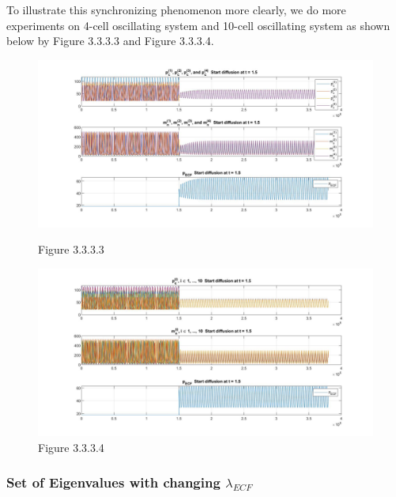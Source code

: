 \documentclass[12pt]{article}
\renewcommand{\(}{\left (}
\renewcommand{\)}{\right )}
\begin{document}
\newpage

To illustrate this synchronizing phenomenon more clearly, we do more experiments on 4-cell oscillating system and 10-cell oscillating system as shown below by Figure 3.3.3.3 and Figure 3.3.3.4.

\vspace{10mm}

\begin{figure}[h!]
    \centering
	\begin{minipage}{0.99\textwidth}
		\centering
		\includegraphics[width=\textwidth]{UU_M.jpg}
		\caption*{\small Figure 3.3.3.3}
	\end{minipage}
    \centering
	\begin{minipage}{0.99\textwidth}
		\centering
		\includegraphics[width=\textwidth]{UU_10.jpg}
		\caption*{\small Figure 3.3.3.4}
	\end{minipage}
\end{figure}

\newpage

\subsubsection{Set of Eigenvalues with changing $\lambda_{ECF}$}
\end{document}
